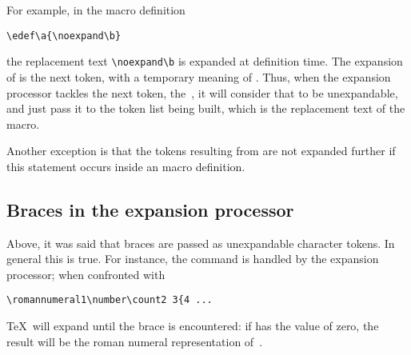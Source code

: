 \documentclass[letterpaper]{book}
\begin{document}
For example,
in the macro definition
\begin{verbatim}
\edef\a{\noexpand\b}
\end{verbatim}
the replacement text \verb>\noexpand\b> is expanded at definition 
time. The expansion of  is the next token, with
a temporary meaning of . Thus, when the expansion
processor tackles the next token, the~, it will consider
that to be unexpandable, and just pass it to the token list
being built, which is the replacement text of the macro.

Another exception is that the tokens
resulting from 
are not expanded further if this statement occurs
inside an  macro definition.

\subsection{Braces in the expansion processor}

Above, it was said that braces are passed as unexpandable
character tokens. In general this is true. For instance,
the  command is handled by the expansion
processor; when confronted with 
\begin{verbatim}
\romannumeral1\number\count2 3{4 ...
\end{verbatim} 
\TeX\ will expand until the brace is encountered:
if  has the value of zero, the result will be
the roman numeral representation of~.
\end{document}
